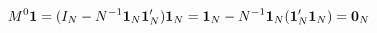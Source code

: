 \documentclass[11pt,oneside,a4paper]{article}
\numberwithin{equation}{section}
\begin{document}
\vspace{-1 em}
\begin{align*}
M^{0} \boldsymbol{1} &= 
( I_{N} - N^{-1} \boldsymbol{1}_{N} \boldsymbol{1}_{N}' ) \boldsymbol{1}_{N}
= 
\boldsymbol{1}_{N} - N^{-1} \boldsymbol{1}_{N} (\boldsymbol{1}_{N}' \boldsymbol{1}_{N}) 
=
\boldsymbol{0}_{N} 
\end{align*}


\clearpage
\renewcommand\bibname{REFERENCES} 


\end{document}
